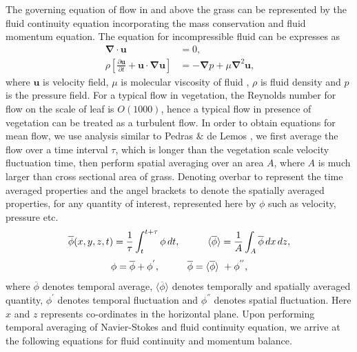 \documentclass[12pt]{report}   %
\newcommand{\bu}{\mathbf{u}}
\newcommand{\grad}{\mathbf{\nabla}}
\renewcommand{\bar}{\overline}
\begin{document}
The governing equation of flow in and above the grass can be represented by the fluid continuity equation incorporating the mass conservation and fluid momentum equation. The equation for incompressible fluid can be expresses as
\begin{equation}\
\begin{split}
  \grad \cdot {\bu}&=0, \\
 \rho \left[ \frac{\partial {\bu}  }{\partial t}+  {\bu} \cdot \grad \bu  \right ] &= - \grad{p} +\mu \grad^2\bu ,
\end{split}
\label{NavierStokes}
\end{equation}
where $\bu$ is velocity field, $\mu$ is molecular viscosity of fluid , $\rho$ is fluid density and $p$ is the pressure field.
For a typical flow in vegetation, the Reynolds number for flow on the scale of leaf is $O(1000)$, hence a typical flow in presence of vegetation can be treated as a turbulent flow. In order to obtain equations for mean flow, we use analysis similar to Pedras $\&$ de Lemos \cite{Pedras00}, we first average the flow over a time interval $\tau$, which is longer than the vegetation scale velocity fluctuation time, then perform spatial averaging over an area $A$, where $A$ is much larger than cross sectional area of grass. Denoting 
overbar to represent the time averaged properties and the angel brackets to denote the spatially averaged properties, for any quantity of interest, represented here by $\phi$ such as velocity, pressure etc.
  \[ \bar{\phi}(x,y,z,t) = \frac{1}{\tau} \int_{t}^{t+\tau} \phi  \, dt, \hspace{1.cm}  \langle \bar{\phi}\rangle = \frac{1}{A} \int_{A} \bar{\phi}  \,dx \,dz, \]
  \[\phi = \bar{\phi}+\phi^{'}, \hspace{1.cm}  \bar{\phi} = \langle \bar{\phi} \rangle \ +\phi^{''}, \]
 where $\bar{\phi}$ denotes temporal average, $\langle \bar{\phi} \rangle$ denotes temporally and spatially averaged quantity, $\phi^{'}$ denotes temporal fluctuation and $\phi^{''}$ denotes spatial fluctuation. Here $x$ and $z$ represents co-ordinates in the horizontal plane. Upon performing temporal averaging of Navier-Stokes and fluid continuity equation, we arrive at the following equations for fluid continuity and momentum balance.
\end{document}
